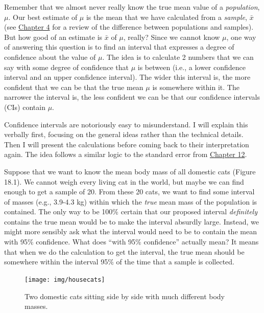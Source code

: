 \documentclass[
  openany]{scrbook}
\begin{document}
Remember that we almost never really know the true mean value of a \emph{population}, \(\mu\).
Our best estimate of \(\mu\) is the mean that we have calculated from a \emph{sample}, \(\bar{x}\) (see \protect\hyperlink{Chapter_4}{Chapter 4} for a review of the difference between populations and samples).
But how good of an estimate is \(\bar{x}\) of \(\mu\), really?
Since we cannot know \(\mu\), one way of answering this question is to find an interval that expresses a degree of confidence about the value of \(\mu\).
The idea is to calculate 2 numbers that we can say with some degree of confidence that \(\mu\) is between (i.e., a lower confidence interval and an upper confidence interval).
The wider this interval is, the more confident that we can be that the true mean \(\mu\) is somewhere within it.
The narrower the interval is, the less confident we can be that our confidence intervals (CIs) contain \(\mu\).

Confidence intervals are notoriously easy to misunderstand.
I will explain this verbally first, focusing on the general ideas rather than the technical details.
Then I will present the calculations before coming back to their interpretation again.
The idea follows a similar logic to the standard error from \protect\hyperlink{Chapter_12}{Chapter 12}.

Suppose that we want to know the mean body mass of all domestic cats (Figure 18.1).
We cannot weigh every living cat in the world, but maybe we can find enough to get a sample of 20.
From these 20 cats, we want to find some interval of masses (e.g., 3.9-4.3 kg) within which the \emph{true} mean mass of the population is contained.
The only way to be 100\% certain that our proposed interval \emph{definitely} contains the true mean would be to make the interval absurdly large.
Instead, we might more sensibly ask what the interval would need to be to contain the mean with 95\% confidence.
What does ``with 95\% confidence'' actually mean?
It means that when we do the calculation to get the interval, the true mean should be somewhere within the interval 95\% of the time that a sample is collected.

\begin{figure}
\texttt{[image: img/housecats]} \caption{Two domestic cats sitting side by side with much different body masses.}\label{fig:unnamed-chunk-75}
\end{figure}
\end{document}
